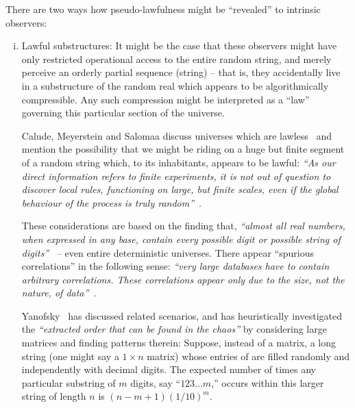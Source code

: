 There are two ways how pseudo-lawfulness might be ``revealed'' to intrinsic observers:
\begin{enumerate}[(i)]

\item Lawful substructures:
It might be the case that these observers might have only restricted operational access to the entire random string,
and merely perceive an orderly partial sequence (string) --
that is, they accidentally live in a substructure of the random real which appears to be algorithmically compressible.
Any such compression might be interpreted as a ``law'' governing this particular section of the universe.

Calude, Meyerstein and Salomaa discuss universes which are lawless~\cite{calude-meyerstein,lawless}
and mention the possibility that
we might be riding on a huge but finite segment of a random string which, to its inhabitants, appears to be lawful:
{\em ``As our direct information
refers to finite experiments, it is not out of question to discover local rules, functioning
on large, but finite scales, even if the global behaviour of the process is truly random''}~\cite[p.~1077]{calude-meyerstein}.

These considerations are based on the finding that, {\em ``almost all real numbers, when expressed in any base,
contain every possible digit or possible string of digits''}~\cite[Theorem~6.1, p.~148]{calude:02} -- even entire deterministic universes.
There appear ``spurious correlations'' in the following sense: {\em ``very large databases have to contain arbitrary correlations.
These correlations appear only due to the size, not the nature, of data''}~\cite{Calude2016}.

Yanofsky~\cite{Yanofsky-chaos} has discussed related scenarios, and has heuristically investigated the {\em ``extracted order that can be found in the chaos''} by
considering large matrices and finding patterns therein:
Suppose, instead of a matrix, a long string (one might say a  $1 \times n$ matrix)
whose entries of are filled randomly and independently with decimal digits.
The expected number of times  any particular substring of $m$ digits, say ``$123\ldots m$,'' occurs
within this larger string of length $n$ is $(n-m+1) (1/10)^m$.




\end{enumerate}
